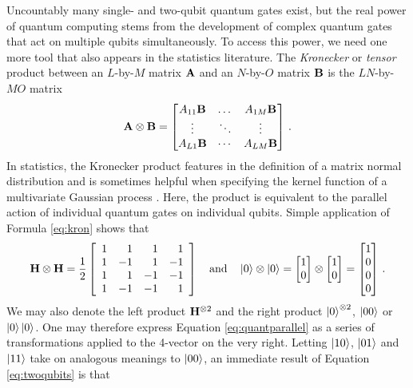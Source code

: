 \documentclass[12pt]{article} %
\begin{document}
Uncountably many single- and two-qubit quantum gates exist, but the real power of quantum computing stems from the development of complex quantum gates that act on multiple qubits simultaneously.   To access this power, we need one more tool that also appears in the statistics literature.  The \emph{Kronecker} or \emph{tensor} product between an $L$-by-$M$ matrix $\mathbf{A}$ and an $N$-by-$O$ matrix $\mathbf{B}$ is the $LN$-by-$MO$ matrix
\begin{align}\label{eq:kron}
\mathbf{A} \otimes \mathbf{B} = \begin{bmatrix}
A_{11} \mathbf{B} & \dots & A_{1M} \mathbf{B} \\
\vdots & \ddots & \vdots \\
A_{L1}\mathbf{B} & \cdots & A_{LM}  \mathbf{B}
\end{bmatrix} \, .
\end{align} 
In statistics, the Kronecker product features in the definition of a matrix normal distribution and is sometimes helpful when specifying the kernel function of a multivariate Gaussian process \citep{werner2008estimation}. Here, the product is equivalent to the parallel action of individual quantum gates on individual qubits.  Simple application of Formula \eqref{eq:kron} shows that
\begin{align}\label{eq:twoqubits}
\mathbf{H} \otimes \mathbf{H} = \frac{1}{2} \left[\begin{array}{rrrr}
1 & 1 & 1 & 1 \\
1 &  -1& 1 & -1 \\
1 & 1 & -1 & -1 \\
1 & -1 & -1 & 1
\end{array}\right] \quad \mbox{and} \quad \ket{0}\otimes\ket{0}=\begin{bmatrix}
1 \\ 0
\end{bmatrix} \otimes \begin{bmatrix}
1 \\ 0
\end{bmatrix} = \begin{bmatrix}
1 \\ 0 \\ 0 \\ 0
\end{bmatrix} \, .
\end{align} 
We may also denote the left product $\mathbf{H}^{\otimes2}$ and the right product $\ket{0}^{\otimes2}$, $\ket{00}$ or $\ket{0}\ket{0}$. One may therefore express Equation \eqref{eq:quantparallel} as a series of transformations applied to the 4-vector on the very right. Letting $\ket{10}$, $\ket{01}$ and $\ket{11}$ take on analogous meanings to $\ket{00}$, an immediate result of Equation \eqref{eq:twoqubits} is that
\end{document}

